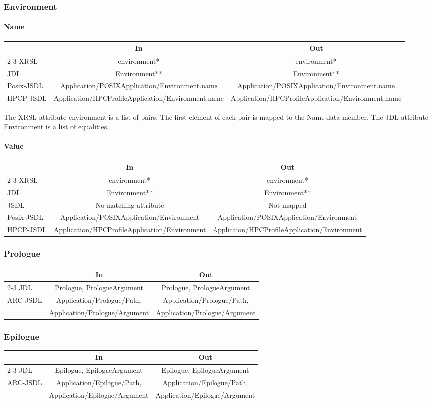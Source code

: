 \documentclass{article}
\newcommand{\subsubsubsection}[1]{\paragraph{#1}}
\newenvironment{inouttabular}%
{\begin{center}\begin{tabular}{l>{\ttfamily\footnotesize}c>{\ttfamily\footnotesize}c}%
\toprule
& \textnormal{\normalsize{In}} & \textnormal{\normalsize{Out}}\\ \cmidrule{2-3}}
{\bottomrule\end{tabular}\end{center}}
\begin{document}
\subsubsection{Environment}
\subsubsubsection{Name}
\begin{inouttabular}
XRSL & environment* & environment*\\
JDL & Environment** & Environment**\\
Posix-JSDL & Application/POSIXApplication/Environment.name & Application/POSIXApplication/Environment.name\\
HPCP-JSDL & Application/HPCProfileApplication/Environment.name & Application/HPCProfileApplication/Environment.name\\
\end{inouttabular}
The XRSL attribute environment is a list of
pairs. The first element of each pair is mapped to the Name data member.
The JDL attribute Environment is a list of equalities.

\subsubsubsection{Value}
\begin{inouttabular}
XRSL & environment* & environment*\\
JDL & Environment** & Environment**\\
JSDL & No matching attribute & Not mapped\\
Posix-JSDL & Application/POSIXApplication/Environment & Application/POSIXApplication/Environment\\
HPCP-JSDL & Application/HPCProfileApplication/Environment & Applicaion/HPCProfileApplication/Environment\\
\end{inouttabular}

\subsubsection{Prologue}
\begin{inouttabular}
JDL & Prologue, PrologueArgument & Prologue, PrologueArgument\\
\multirow{2}{*}{ARC-JSDL} & Application/Prologue/Path, & Application/Prologue/Path,\\
& Application/Prologue/Argument & Application/Prologue/Argument\\
\end{inouttabular}

\subsubsection{Epilogue}
\begin{inouttabular}
JDL & Epilogue, EpilogueArgument & Epilogue, EpilogueArgument\\
\multirow{2}{*}{ARC-JSDL} & Application/Epilogue/Path, & Application/Epilogue/Path,\\
& Application/Epilogue/Argument & Application/Epilogue/Argument\\
\end{inouttabular}
\end{document}
